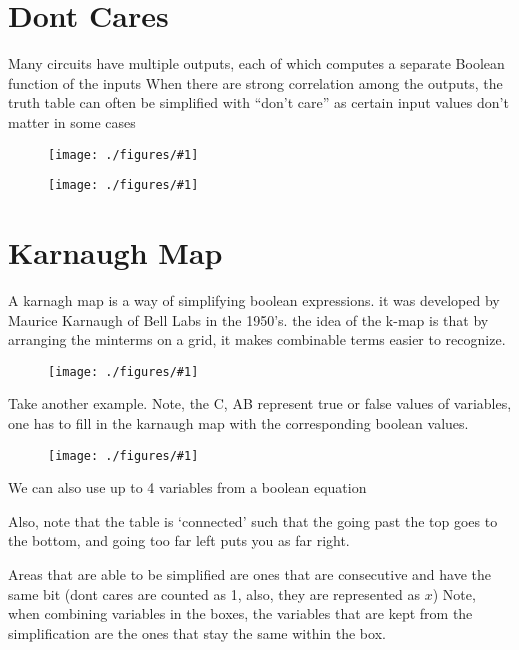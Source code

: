 \documentclass[12pt]{book}
\title{\coursetitle\linebreak\lecturename}
\author{\\Cain Susko\\ 
           \\ \\ \\
      Queen's University 
    \\School of Computing\\}
\newcommand{\incimg}[2]{%
       \begin{figure}[h]
               \centering
               \texttt{[image: ./figures/\#1]}
       \end{figure}
}
\begin{document}
\begin{titlepage}
        \maketitle
\end{titlepage}


\section*{Dont Cares}
Many circuits have multiple outputs, each 
of which computes a separate Boolean 
function of the inputs  
When there are strong correlation among 
the outputs, the truth table can often be 
simplified with “don’t care” as certain 
input values don’t matter in some cases
\incimg{circuit}{0.5}

\incimg{dontcare}{0.7}

\pagebreak

\section*{Karnaugh Map}
A karnagh map is a way of simplifying boolean expressions. it was developed by Maurice Karnaugh of Bell Labs in the 1950's. the idea of the k-map is
that by arranging the minterms on a grid, it makes combinable terms easier to recognize.
\incimg{karnaugh}{0.5}
Take another example. Note, the C, AB represent true or false values of variables, one has to fill
in the karnaugh map with the corresponding boolean values.
\incimg{karnaugh2}{0.5}
We can also use up to 4 variables from a boolean equation

Also, note that the table is `connected' such that the going past the top goes to the bottom, and going too far left puts you as far right.

Areas that are able to be simplified are ones that are consecutive and have the same bit (dont cares are counted as 1, also, they are represented as $x$)
Note, when combining variables in the boxes, the variables that are kept from the simplification are the ones that stay the same within the box.
\end{document}
